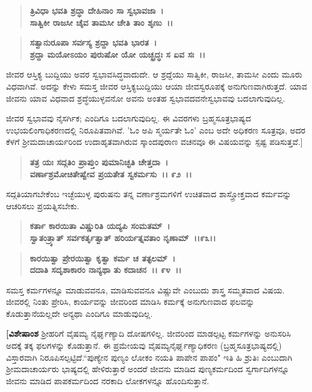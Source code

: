 \begin{verse}
\textbf{ತ್ರಿವಿಧಾ ಭವತಿ ಶ್ರದ್ಧಾ ದೇಹಿನಾಂ ಸಾ ಸ್ವಭಾವಜಾ~।}\\\textbf{ಸಾತ್ವಿಕೀ ರಾಜಸೀ ಚೈವ ತಾಮಸೀ ಚೇತಿ ತಾಂ ಶೃಣು~।।}
\end{verse}

\begin{verse}
\textbf{ಸತ್ವಾನುರೂಪಾ ಸರ್ವಸ್ಯ ಶ್ರದ್ದಾ ಭವತಿ ಭಾರತ~।}\\\textbf{ಶ್ರದ್ದಾ ಮಯೋಽಯಂ ಪುರುಷೋ ಯೋ ಯಚ್ಛ್ರದ್ಧಃ ಸ ಏವ ಸಃ~।।} 
\end{verse}

ಜೀವರ ಆಸ್ತಿಕ್ಯ ಬುದ್ದಿಯು ಅವರ ಸ್ವಭಾವಸಿದ್ಧವಾದುದೇ. ಆ ಶ್ರದ್ದೆಯು ಸಾತ್ವಿಕೀ, ರಾಜಸೀ, ತಾಮಸೀ ಎಂದು ಮೂರು ವಿಧವಾಗಿವೆ. ಅದನ್ನು ಕೇಳು \enginline{-} ಸಮಸ್ತ ಜೀವರ ಆಸ್ತಿಕ್ಯಬುದ್ದಿಯು ಆಯಾ ಜೀವಸ್ವರೂಪಕ್ಕೆ ಅನುಗುಣವಾಗಿರುತ್ತದೆ. ಯಾವ ಜೀವನು ಯಾವ ವಿಧವಾದ ಶ್ರದ್ಧೆಯುಳ್ಳವನೋ ಅವನು ಅಂತಹ ಸ್ವಭಾವದವನೇ\enginline{-}ಸ್ವಭಾವವು ಬದಲಾಗುವುದಿಲ್ಲ.

ಜೀವರ ಸ್ವಭಾವವು ನೈಸರ್ಗಿಕ; ಎಂದಿಗೂ ಬದಲಾಗುವುದಿಲ್ಲ. ಈ ವಿವರಗಳು ಬ್ರಹ್ಮಸೂತ್ರಭಾಷ್ಯದ ಉಭಯಲಿಂಗಾಧಿಕರಣದಲ್ಲಿ ನಿರೂಪಿತವಾಗಿವೆ. 'ಓಂ ಅಪಿ ಸ್ಮರ್ಯತೇ ಓಂ' ಎಂಬ ಅದೇ ಅಧಿಕರಣ ಸೂತ್ರವೂ, ಅದರ ಕೆಳಗೆ ಶ‍್ರೀಮದಾಚಾರ್ಯರಿಂದ ಉದಾಹೃತವಾಗಿರುವ ಸ್ಕಾಂದಪುರಾಣ ವಚನವೂ ಈ ವಿಷಯವನ್ನು ಸ್ಪಷ್ಟ ಪಡಿಸುತ್ತವೆ.]

\begin{verse}
\textbf{ತತ್ರ ಯಃ ಸದ್ಗತಿಂ ಪ್ರಾಪ್ತುಂ ಪುಮಾನಿಚ್ಛತಿ ಚೇತ್ತದಾ~।}\\\textbf{ವರ್ಣಾಶ್ರಮೋಚಿತೇಷ್ವೇವ ಪ್ರಯತೇತ ಸ್ವಕರ್ಮಸು~।। ೯೨~।।}
\end{verse}

ಸದ್ಗತಿಯಾಗಬೇಕೆಂಬ ಇಚ್ಛೆಯುಳ್ಳ ಪುರುಷನು ತನ್ನ ವರ್ಣಾಶ್ರಮಗಳಿಗೆ ಉಚಿತವಾದ ಶಾಸ್ತ್ರೋಕ್ತವಾದ ಕರ್ಮವನ್ನು ಆಚರಿಸಲು ಪ್ರಯತ್ನಿಸಬೇಕು.

\begin{verse}
\textbf{ಕರ್ತಾ ಕಾರಯಿತಾ ವಿಷ್ಣುರಿತಿ ಯದ್ಯಪಿ ಸಂಮತಮ್~।}\\\textbf{ಸ್ವಾತಂತ್ರ್ಯಾತ್ ಸರ್ವಕರ್ತೃತ್ವಾತ್ ಹರಿರ್ಯತ್ನವತಾಂ ನೃಣಾಮ್~।।೯೩।। }
\end{verse}

\begin{verse}
\textbf{ಕಾರಯಿತ್ವಾ ಪ್ರೇರಯಿತ್ವಾ ಕೃತ್ವಾ ಕರ್ಮ ಚ ತತ್ಫಲಮ್~।}\\\textbf{ದದಾತಿ ಸದೃಶಾಕಾರಂ ನಾನ್ಯಥಾ ತು ಕದಾಚನ~।। ೯೪~।।}
\end{verse}

ಸಮಸ್ತ ಕರ್ಮಗಳನ್ನೂ ಮಾಡುವವನೂ, ಮಾಡಿಸುವವನೂ ವಿಷ್ಣುವೇ ಎಂಬುದು ಶಾಸ್ತ್ರ ಸಮ್ಮತವಾದ ವಿಷಯ. ಜೀವರಲ್ಲಿ ನಿಂತು ಪ್ರೇರಿಸಿ, ಕಾರ್ಯವನ್ನು ಜೀವರಿಂದ ಮಾಡಿಸಿ ಕರ್ಮಕ್ಕೆ ಅನುಗುಣವಾದ ಫಲವನ್ನು ಕೊಡುತ್ತಾನೆಯಲ್ಲದೇ ಅನ್ಯಥಾ ಎಂದಿಗೂ ಮಾಡುವುದಿಲ್ಲ.

\textbf{[ವಿಶೇಷಾಂಶ\enginline{-}} ಶ‍್ರೀಹರಿಗೆ ವೈಷಮ್ಯ ನೈರ್ಘೃಣ್ಯಾದಿ ದೋಷಗಳಿಲ್ಲ. ಜೀವರಿಂದ ಮಾಡಲ್ಪಟ್ಟ ಕರ್ಮಗಳನ್ನು ಅನುಸರಿಸಿ ಅದಕ್ಕೆ ತಕ್ಕ ಫಲಗಳನ್ನು ಕೊಡುತ್ತಾನೆ. ಈ ಪ್ರಮೇಯವು ವೈಷಮ್ಯನೈರ್ಘೃಣ್ಯಾಧಿಕರಣ (ಬ್ರಹ್ಮಸೂತ್ರಭಾಷ್ಯದಲ್ಲಿ) ವಿಸ್ತಾರವಾಗಿ ನಿರೂಪಿಸಲ್ಪಟ್ಟಿದೆ.\break “ಪುಣ್ಯೇನ ಪುಣ್ಯಂ ಲೋಕಂ ನಯತಿ ಪಾಪೇನ ಪಾಪಂ" ಇತಿ ಹಿ ಶ್ರುತಿಃ ಎಂಬುದಾಗಿ ಶ‍್ರೀಮದಾಚಾರ್ಯರು ಭಾಷ್ಯದಲ್ಲಿ ಹೇಳಿರುತ್ತಾರೆ\enginline{-} ಅಂದರೆ ಜೀವನು ಮಾಡಿದ ಪುಣ್ಯಕರ್ಮದಿಂದ ಸ್ವರ್ಗಾದಿಗಳನ್ನೂ ಜೀವನು ಮಾಡಿದ ಪಾಪಕರ್ಮದಿಂದ ನರಕಾದಿ ಲೋಕಗಳನ್ನೂ ಹೊಂದಿಸುತ್ತಾನೆ.

